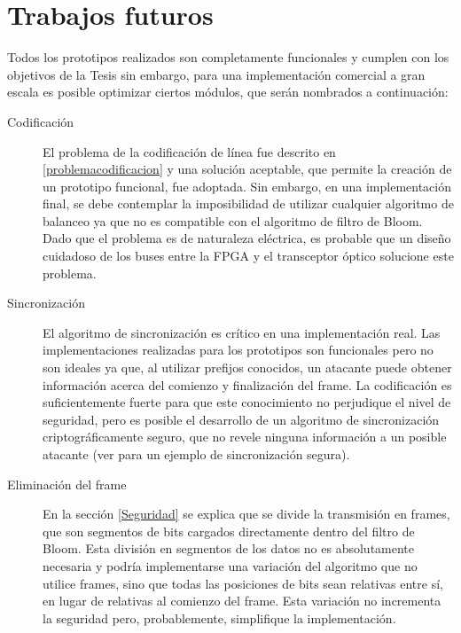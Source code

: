 \section{Trabajos futuros}

Todos los prototipos realizados son completamente funcionales y cumplen con los objetivos de la Tesis sin embargo, para una implementación comercial a gran escala es posible optimizar ciertos módulos, que serán nombrados a continuación:
\begin{description}
 \item[Codificación] 
El problema de la codificación de línea fue descrito en \ref{problemacodificacion} y una solución aceptable, que permite la creación de un prototipo funcional, fue adoptada. Sin embargo, en una implementación final, se debe contemplar la imposibilidad de utilizar cualquier algoritmo de balanceo ya que no es compatible con el algoritmo de filtro de Bloom. Dado que el problema es de naturaleza eléctrica, es probable que un diseño cuidadoso de los buses entre la FPGA y el transceptor óptico solucione este problema.
 \item[Sincronización] 
 El algoritmo de sincronización es crítico en una implementación real. Las implementaciones realizadas para los prototipos son funcionales pero no son ideales ya que, al utilizar prefijos conocidos, un atacante puede obtener información acerca del comienzo y finalización del frame. La codificación es suficientemente fuerte para que este conocimiento no perjudique el nivel de seguridad, pero es posible el desarrollo de un algoritmo de sincronización criptográficamente seguro, que no revele ninguna información a un posible atacante (ver \cite{jung1999encryption} para un ejemplo de sincronización segura).
 \item[Eliminación del frame] 
 En la sección \ref{Seguridad} se explica que se divide la transmisión en frames, que son segmentos de bits cargados directamente dentro del filtro de Bloom. Esta división en segmentos de los datos no es absolutamente necesaria y podría implementarse una variación del algoritmo que no utilice frames, sino que todas las posiciones de bits sean relativas entre sí, en lugar de relativas al comienzo del frame. Esta variación no incrementa la seguridad pero, probablemente, simplifique la implementación.
 \item[] 
\end{description}

